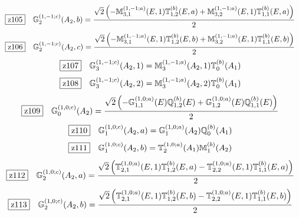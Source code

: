 \documentclass[fleqn,10pt,landscape]{jsarticle}
\begin{document}
\begin{dmath*}
\hspace*{3mm}\fbox{z105}\quad \mathbb{G}_{2}^{(1,-1;c)}(A_{2},b)=\frac{\sqrt{2} \left(- \mathbb{M}_{3,1}^{(1,-1;a)}(E,1) \mathbb{T}_{1,2}^{(b)}(E,a) + \mathbb{M}_{3,2}^{(1,-1;a)}(E,1) \mathbb{T}_{1,1}^{(b)}(E,a)\right)}{2}
\end{dmath*}
\begin{dmath*}
\hspace*{3mm}\fbox{z106}\quad \mathbb{G}_{2}^{(1,-1;c)}(A_{2},c)=\frac{\sqrt{2} \left(- \mathbb{M}_{3,1}^{(1,-1;a)}(E,1) \mathbb{T}_{1,2}^{(b)}(E,b) + \mathbb{M}_{3,2}^{(1,-1;a)}(E,1) \mathbb{T}_{1,1}^{(b)}(E,b)\right)}{2}
\end{dmath*}
\begin{dmath*}
\hspace*{3mm}\fbox{z107}\quad \mathbb{G}_{3}^{(1,-1;c)}(A_{2},1)=\mathbb{M}_{3}^{(1,-1;a)}(A_{2},1) \mathbb{T}_{0}^{(b)}(A_{1})
\end{dmath*}
\begin{dmath*}
\hspace*{3mm}\fbox{z108}\quad \mathbb{G}_{3}^{(1,-1;c)}(A_{2},2)=\mathbb{M}_{3}^{(1,-1;a)}(A_{2},2) \mathbb{T}_{0}^{(b)}(A_{1})
\end{dmath*}
\begin{dmath*}
\hspace*{3mm}\fbox{z109}\quad \mathbb{G}_{0}^{(1,0;c)}(A_{2})=\frac{\sqrt{2} \left(- \mathbb{G}_{1,1}^{(1,0;a)}(E) \mathbb{Q}_{1,2}^{(b)}(E) + \mathbb{G}_{1,2}^{(1,0;a)}(E) \mathbb{Q}_{1,1}^{(b)}(E)\right)}{2}
\end{dmath*}
\begin{dmath*}
\hspace*{3mm}\fbox{z110}\quad \mathbb{G}_{1}^{(1,0;c)}(A_{2},a)=\mathbb{G}_{1}^{(1,0;a)}(A_{2}) \mathbb{Q}_{0}^{(b)}(A_{1})
\end{dmath*}
\begin{dmath*}
\hspace*{3mm}\fbox{z111}\quad \mathbb{G}_{1}^{(1,0;c)}(A_{2},b)=\mathbb{T}_{2}^{(1,0;a)}(A_{1}) \mathbb{M}_{1}^{(b)}(A_{2})
\end{dmath*}
\begin{dmath*}
\hspace*{3mm}\fbox{z112}\quad \mathbb{G}_{2}^{(1,0;c)}(A_{2},a)=\frac{\sqrt{2} \left(\mathbb{T}_{2,1}^{(1,0;a)}(E,1) \mathbb{T}_{1,2}^{(b)}(E,a) - \mathbb{T}_{2,2}^{(1,0;a)}(E,1) \mathbb{T}_{1,1}^{(b)}(E,a)\right)}{2}
\end{dmath*}
\begin{dmath*}
\hspace*{3mm}\fbox{z113}\quad \mathbb{G}_{2}^{(1,0;c)}(A_{2},b)=\frac{\sqrt{2} \left(\mathbb{T}_{2,1}^{(1,0;a)}(E,1) \mathbb{T}_{1,2}^{(b)}(E,b) - \mathbb{T}_{2,2}^{(1,0;a)}(E,1) \mathbb{T}_{1,1}^{(b)}(E,b)\right)}{2}
\end{dmath*}
\end{document}
